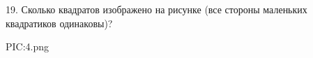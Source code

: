 19. Сколько квадратов изображено на рисунке (все стороны маленьких квадратиков одинаковы)?
\begin{center}
{{PIC:4.png}}
\end{center}
